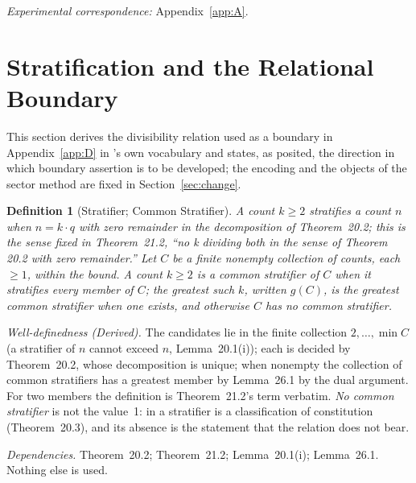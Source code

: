 \documentclass[pdflatex,sn-mathphys-num]{sn-jnl}
\theoremstyle{thmstyleone}%
\theoremstyle{thmstyletwo}%
\theoremstyle{thmstylethree}%
\newtheorem{definition}{Definition}[section]
\newtheorem{definition}{Definition}[section]
\newcommand{\PA}{\cite{Swanagon2026PA}}
\newcommand{\q}[1]{``#1''}        %
\newcommand{\deps}[1]{\par\begin{sloppypar}\noindent\emph{Dependencies.} #1 Nothing else is used.\end{sloppypar}}
\begin{document}
\noindent\emph{Experimental correspondence:} Appendix~\ref{app:A}.

\section{Stratification and the Relational Boundary}\label{sec:encoding}
This section derives the divisibility relation used as a boundary in Appendix~\ref{app:D} in \PA's own vocabulary and states, as posited, the direction in which boundary assertion is to be developed; the encoding and the objects of the sector method are fixed in Section~\ref{sec:change}.

\begin{definition}[Stratifier; Common Stratifier]\label{def:stratifier}
A count $k\ge2$ \emph{stratifies} a count $n$ when $n=k\cdot q$ with zero remainder in the decomposition of Theorem~20.2; this is the sense fixed in Theorem~21.2, \q{no k dividing both in the sense of Theorem 20.2 with zero remainder.} Let $C$ be a finite nonempty collection of counts, each $\ge1$, within the bound. A count $k\ge2$ is a \emph{common stratifier} of $C$ when it stratifies every member of $C$; the greatest such $k$, written $g(C)$, is the \emph{greatest common stratifier} when one exists, and otherwise $C$ has \emph{no common stratifier}.
\end{definition}
\noindent\emph{Well-definedness (Derived).} The candidates lie in the finite collection $2,\dots,\min C$ (a stratifier of $n$ cannot exceed $n$, Lemma~20.1(i)); each is decided by Theorem~20.2, whose decomposition is unique; when nonempty the collection of common stratifiers has a greatest member by Lemma~26.1 by the dual argument. For two members the definition is Theorem~21.2's term verbatim. \emph{No common stratifier} is not the value~1: in \PA{} a stratifier is a classification of constitution (Theorem~20.3), and its absence is the statement that the relation does not bear.
\deps{Theorem~20.2; Theorem~21.2; Lemma~20.1(i); Lemma~26.1.}
\end{document}
